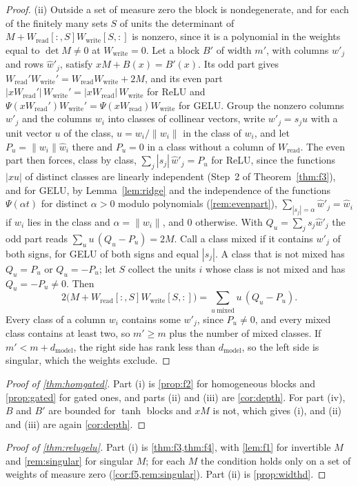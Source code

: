 \documentclass[10pt]{article}
\theoremstyle{definition}
\theoremstyle{remark}
\newcommand{\Wread}{W_{\mathrm{read}}}
\newcommand{\Wwrite}{W_{\mathrm{write}}}
\newcommand{\dm}{d_{\mathrm{model}}}
\newcommand{\norm}[1]{\lVert #1\rVert}
\begin{document}
\begin{proof}
(ii) Outside a set of measure zero the block is nondegenerate, and for each of the finitely many sets $S$ of units the determinant of $M + \Wread[{:},S]\Wwrite[S,{:}]$ is nonzero, since it is a polynomial in the weights equal to $\det M \neq 0$ at $\Wwrite = 0$. Let a block $B'$ of width $m'$, with columns $w'_j$ and rows $\hat w'_j$, satisfy $xM + B(x) = B'(x)$. Its odd part gives $\Wread'\Wwrite' = \Wread\Wwrite + 2M$, and its even part $|x\Wread'|\,\Wwrite' = |x\Wread|\,\Wwrite$ for ReLU and $\Psi(x\Wread')\Wwrite' = \Psi(x\Wread)\Wwrite$ for GELU. Group the nonzero columns $w'_j$ and the columns $w_i$ into classes of collinear vectors, write $w'_j = s_ju$ with a unit vector $u$ of the class, $u = w_i/\norm{w_i}$ in the class of $w_i$, and let $P_u = \norm{w_i}\hat w_i$ there and $P_u = 0$ in a class without a column of $\Wread$. The even part then forces, class by class, $\sum_j |s_j|\,\hat w'_j = P_u$ for ReLU, since the functions $|xu|$ of distinct classes are linearly independent (Step~2 of Theorem~\ref{thm:f3}), and for GELU, by Lemma~\ref{lem:ridge} and the independence of the functions $\Psi(\alpha t)$ for distinct $\alpha > 0$ modulo polynomials (\cref{rem:evenpart}), $\sum_{|s_j| = \alpha}\hat w'_j = \hat w_i$ if $w_i$ lies in the class and $\alpha = \norm{w_i}$, and $0$ otherwise. With $Q_u = \sum_j s_j\hat w'_j$ the odd part reads $\sum_u u\,(Q_u - P_u) = 2M$. Call a class mixed if it contains $w'_j$ of both signs, for GELU of both signs and equal $|s_j|$. A class that is not mixed has $Q_u = P_u$ or $Q_u = -P_u$; let $S$ collect the units $i$ whose class is not mixed and has $Q_u = -P_u \neq 0$. Then
\[
2\big(M + \Wread[{:},S]\Wwrite[S,{:}]\big) = \sum_{u\ \mathrm{mixed}} u\,(Q_u - P_u) .
\]
Every class of a column $w_i$ contains some $w'_j$, since $P_u \neq 0$, and every mixed class contains at least two, so $m' \ge m$ plus the number of mixed classes. If $m' < m + \dm$, the right side has rank less than $\dm$, so the left side is singular, which the weights exclude.
\end{proof}

\begin{proof}[Proof of \cref{thm:homgated}]
Part (i) is \cref{prop:f2} for homogeneous blocks and \cref{prop:gated} for gated ones, and parts (ii) and (iii) are \cref{cor:depth}. For part (iv), $B$ and $B'$ are bounded for $\tanh$ blocks and $xM$ is not, which gives (i), and (ii) and (iii) are again \cref{cor:depth}.
\end{proof}

\begin{proof}[Proof of \cref{thm:relugelu}]
Part (i) is \cref{thm:f3,thm:f4}, with \cref{lem:f1} for invertible $M$ and \cref{rem:singular} for singular $M$; for each $M$ the condition holds only on a set of weights of measure zero (\cref{cor:f5,rem:singular}). Part (ii) is \cref{prop:widthd}.
\end{proof}
\end{document}
